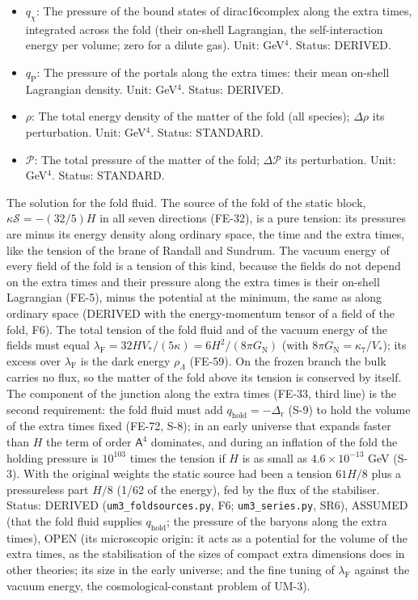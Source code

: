 \documentclass[
  10pt,
]{article}
\begin{document}
\begin{itemize}
\item
  \(q_\chi\): The pressure of the bound states of dirac16complex along
  the extra times, integrated across the fold (their on-shell
  Lagrangian, the self-interaction energy per volume; zero for a dilute
  gas). Unit: GeV\(^4\). Status: DERIVED.
\item
  \(q_{\mathrm{P}}\): The pressure of the portals along the extra times:
  their mean on-shell Lagrangian density. Unit: GeV\(^4\). Status:
  DERIVED.
\item
  \(\rho\): The total energy density of the matter of the fold (all
  species); \(\Delta\rho\) its perturbation. Unit: GeV\(^4\). Status:
  STANDARD.
\item
  \(\mathcal{P}\): The total pressure of the matter of the fold;
  \(\Delta\mathcal{P}\) its perturbation. Unit: GeV\(^4\). Status:
  STANDARD.
\end{itemize}

The solution for the fold fluid. The source of the fold of the static
block, \(\kappa\mathcal{S} = -(32/5)H\) in all seven directions (FE-32),
is a pure tension: its pressures are minus its energy density along
ordinary space, the time and the extra times, like the tension of the
brane of Randall and Sundrum. The vacuum energy of every field of the
fold is a tension of this kind, because the fields do not depend on the
extra times and their pressure along the extra times is their on-shell
Lagrangian (FE-5), minus the potential at the minimum, the same as along
ordinary space (DERIVED with the energy-momentum tensor of a field of
the fold, F6). The total tension of the fold fluid and of the vacuum
energy of the fields must equal
\(\lambda_{\mathrm{F}} = 32HV_*/(5\kappa) = 6H^2/(8\pi G_{\mathrm{N}})\)
(with \(8\pi G_{\mathrm{N}} = \kappa_7/V_*\)); its excess over
\(\lambda_{\mathrm{F}}\) is the dark energy \(\rho_\Lambda\) (FE-59). On
the frozen branch the bulk carries no flux, so the matter of the fold
above its tension is conserved by itself. The component of the junction
along the extra times (FE-33, third line) is the second requirement: the
fold fluid must add \(q_{\mathrm{hold}} = -\Delta_{\mathrm{r}}\) (S-9)
to hold the volume of the extra times fixed (FE-72, S-8); in an early
universe that expands faster than \(H\) the term of order
\(\mathsf{A}^4\) dominates, and during an inflation of the fold the
holding pressure is \(10^{103}\) times the tension if \(H\) is as small
as \(4.6\times10^{-13}\) GeV (S-3). With the original weights the static
source had been a tension \(61H/8\) plus a pressureless part \(H/8\)
(1/62 of the energy), fed by the flux of the stabiliser. Status: DERIVED
(\texttt{um3\_foldsources.py}, F6; \texttt{um3\_series.py}, SR6),
ASSUMED (that the fold fluid supplies \(q_{\mathrm{hold}}\); the
pressure of the baryons along the extra times), OPEN (its microscopic
origin: it acts as a potential for the volume of the extra times, as the
stabilisation of the sizes of compact extra dimensions does in other
theories; its size in the early universe; and the fine tuning of
\(\lambda_{\mathrm{F}}\) against the vacuum energy, the
cosmological-constant problem of UM-3).
\end{document}
